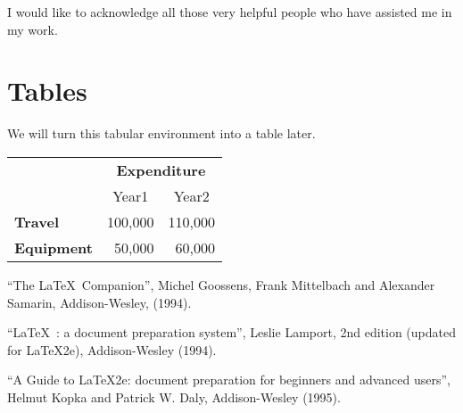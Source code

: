 \documentclass[12pt]{scrreprt}
\begin{document}
I would like to acknowledge all those
very helpful people who have assisted
me in my work.

\appendix
\chapter{Tables}

We will turn this tabular environment into a table later.

\begin{tabular}{lrr}
 & \multicolumn{2}{c}{\bfseries Expenditure}\\
 & \multicolumn{1}{c}{Year1} & \multicolumn{1}{c}{Year2}\\
\bfseries Travel & 100,000 & 110,000\\
\bfseries Equipment & 50,000 & 60,000
\end{tabular}

\begin{thebibliography}{1}
 ``The \LaTeX\ Companion'', Michel Goossens, Frank Mittelbach and
Alexander Samarin, Addison-Wesley, (1994).

 ``\LaTeX\ : a document preparation system'', Leslie Lamport,
2nd edition (updated for \LaTeX2e), Addison-Wesley (1994).

 ``A Guide to \LaTeX2e: document preparation for beginners
and advanced users'', Helmut Kopka and Patrick W. Daly, Addison-Wesley (1995).

\end{thebibliography}
\end{document}

